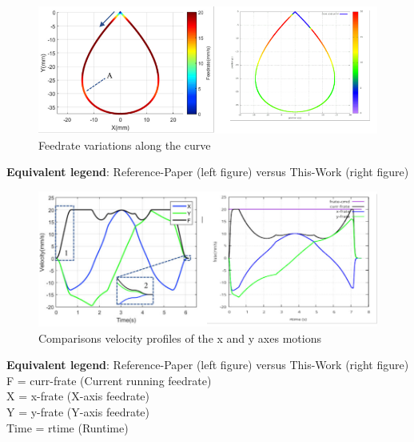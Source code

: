 \clearpage
\pagebreak
\begin{landscape} 
	
\begin{figure}
	\centering
	\caption  {Feedrate variations along the curve}
	\label{img-Feedrate variations along the curve}
	\includegraphics[width= 1.40\textwidth]{Chap4/Comparisons/01-Comparison-Feedrate-Variations-Along-The-Curve.png} 
\end{figure}		

\noindent
\textbf{Equivalent legend}: Reference-Paper (left figure) versus This-Work (right figure)\\

\end{landscape}
\clearpage
\pagebreak
\begin{landscape} 

\begin{figure}
	\centering
	\caption  {Comparisons velocity profiles of the x and y axes motions}
	\label{img-Comparisons velocity profiles of the x and y axes motions}
	\includegraphics[width= 1.40\textwidth]{Chap4/Comparisons/02-Comparison-Feedrate-Profiles-X-and-Y-Axes.png} 
\end{figure}		

\noindent
\textbf{Equivalent legend}: Reference-Paper (left figure) versus This-Work (right figure)\\
F = curr-frate (Current running feedrate)\\
X = x-frate (X-axis feedrate)\\
Y = y-frate (Y-axis feedrate)\\
Time = rtime (Runtime)\\

\end{landscape}


